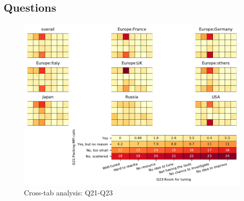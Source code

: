 
\subsection{Questions}


\begin{figure}
\begin{center}
\includegraphics[width=12cm]{../pdfs/Q21-Q23.pdf}
\caption{Cross-tab analysis: Q21-Q23}
\label{fig:Q21-Q23}
\end{center}
\end{figure}
